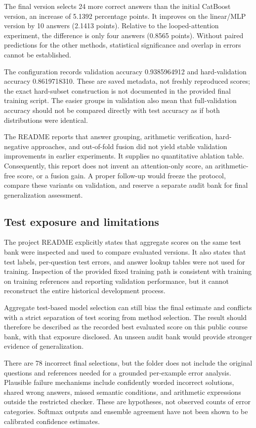 \documentclass[11pt]{article}
\begin{document}
The final version selects 24 more correct answers than the initial CatBoost version, an increase of 5.1392 percentage points. It improves on the linear/MLP version by 10 answers (2.1413 points). Relative to the looped-attention experiment, the difference is only four answers (0.8565 points). Without paired predictions for the other methods, statistical significance and overlap in errors cannot be established.

The configuration records validation accuracy 0.9385964912 and hard-validation accuracy 0.8619718310. These are saved metadata, not freshly reproduced scores; the exact hard-subset construction is not documented in the provided final training script. The easier groups in validation also mean that full-validation accuracy should not be compared directly with test accuracy as if both distributions were identical.

The README reports that answer grouping, arithmetic verification, hard-negative approaches, and out-of-fold fusion did not yield stable validation improvements in earlier experiments. It supplies no quantitative ablation table. Consequently, this report does not invent an attention-only score, an arithmetic-free score, or a fusion gain. A proper follow-up would freeze the protocol, compare these variants on validation, and reserve a separate audit bank for final generalization assessment.

\subsection{Test exposure and limitations}
The project README explicitly states that aggregate scores on the same test bank were inspected and used to compare evaluated versions. It also states that test labels, per-question test errors, and answer lookup tables were not used for training. Inspection of the provided fixed training path is consistent with training on training references and reporting validation performance, but it cannot reconstruct the entire historical development process.

Aggregate test-based model selection can still bias the final estimate and conflicts with a strict separation of test scoring from method selection. The result should therefore be described as the recorded best evaluated score on this public course bank, with that exposure disclosed. An unseen audit bank would provide stronger evidence of generalization.

There are 78 incorrect final selections, but the folder does not include the original questions and references needed for a grounded per-example error analysis. Plausible failure mechanisms include confidently worded incorrect solutions, shared wrong answers, missed semantic conditions, and arithmetic expressions outside the restricted checker. These are hypotheses, not observed counts of error categories. Softmax outputs and ensemble agreement have not been shown to be calibrated confidence estimates.
\end{document}
